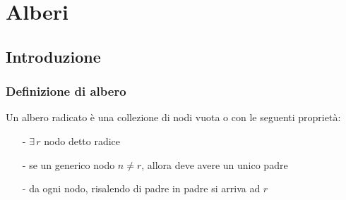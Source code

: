 \documentclass[a4paper]{article}
\begin{document}
\newpage


\section{Alberi}
\subsection{Introduzione}
\subsubsection*{Definizione di albero}
Un albero radicato è una collezione di nodi vuota o con le seguenti proprietà:
\begin{itemize}[topsep=3pt, itemsep=0pt]
	\item[-] \(\exists \, r\) nodo detto radice
	\item[-] se un generico nodo \(n \neq r\), allora deve avere un unico padre
	\item[-] da ogni nodo, risalendo di padre in padre si arriva ad \(r\)
\end{itemize}
\end{document}
